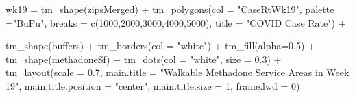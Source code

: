 \documentclass[
  letterpaper,
  DIV=11,
  numbers=noendperiod]{scrreprt}
\newenvironment{Shaded}{\begin{snugshade}}{\end{snugshade}}
\newcommand{\AttributeTok}[1]{\textcolor[rgb]{0.40,0.45,0.13}{#1}}
\newcommand{\DecValTok}[1]{\textcolor[rgb]{0.68,0.00,0.00}{#1}}
\newcommand{\FloatTok}[1]{\textcolor[rgb]{0.68,0.00,0.00}{#1}}
\newcommand{\FunctionTok}[1]{\textcolor[rgb]{0.28,0.35,0.67}{#1}}
\newcommand{\NormalTok}[1]{\textcolor[rgb]{0.00,0.23,0.31}{#1}}
\newcommand{\OtherTok}[1]{\textcolor[rgb]{0.00,0.23,0.31}{#1}}
\newcommand{\SpecialCharTok}[1]{\textcolor[rgb]{0.37,0.37,0.37}{#1}}
\newcommand{\StringTok}[1]{\textcolor[rgb]{0.13,0.47,0.30}{#1}}
\begin{document}
\begin{Shaded}
\begin{Highlighting}[]
\NormalTok{wk19 }\OtherTok{=} \FunctionTok{tm\_shape}\NormalTok{(zipsMerged) }\SpecialCharTok{+}
  \FunctionTok{tm\_polygons}\NormalTok{(}\AttributeTok{col =} \StringTok{"CaseRtWk19"}\NormalTok{, }
              \AttributeTok{palette =}\StringTok{"BuPu"}\NormalTok{,}
              \AttributeTok{breaks =} \FunctionTok{c}\NormalTok{(}\DecValTok{1000}\NormalTok{,}\DecValTok{2000}\NormalTok{,}\DecValTok{3000}\NormalTok{,}\DecValTok{4000}\NormalTok{,}\DecValTok{5000}\NormalTok{),}
              \AttributeTok{title =} \StringTok{"COVID Case Rate"}\NormalTok{) }\SpecialCharTok{+}

  \FunctionTok{tm\_shape}\NormalTok{(buffers) }\SpecialCharTok{+} \FunctionTok{tm\_borders}\NormalTok{(}\AttributeTok{col =} \StringTok{"white"}\NormalTok{) }\SpecialCharTok{+} \FunctionTok{tm\_fill}\NormalTok{(}\AttributeTok{alpha=}\FloatTok{0.5}\NormalTok{) }\SpecialCharTok{+}
  \FunctionTok{tm\_shape}\NormalTok{(methadoneSf) }\SpecialCharTok{+} \FunctionTok{tm\_dots}\NormalTok{(}\AttributeTok{col =} \StringTok{"white"}\NormalTok{, }\AttributeTok{size =} \FloatTok{0.3}\NormalTok{) }\SpecialCharTok{+}
  \FunctionTok{tm\_layout}\NormalTok{(}\AttributeTok{scale =} \FloatTok{0.7}\NormalTok{,}
            \AttributeTok{main.title =} \StringTok{"Walkable Methadone Service Areas in Week 19"}\NormalTok{,}
            \AttributeTok{main.title.position =} \StringTok{"center"}\NormalTok{,}
            \AttributeTok{main.title.size =} \DecValTok{1}\NormalTok{,}
            \AttributeTok{frame.lwd =} \DecValTok{0}\NormalTok{)}


\end{Highlighting}
\end{Shaded}
\end{document}
